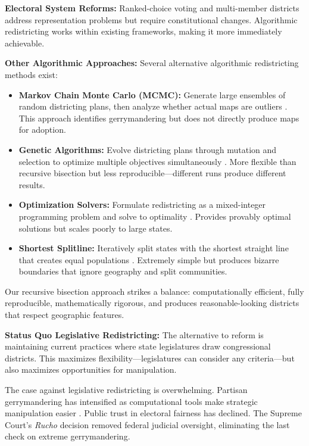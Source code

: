 \textbf{Electoral System Reforms:} Ranked-choice voting and multi-member districts address representation problems but require constitutional changes. Algorithmic redistricting works within existing frameworks, making it more immediately achievable.

\textbf{Other Algorithmic Approaches:} Several alternative algorithmic redistricting methods exist:

\begin{itemize}
    \item \textbf{Markov Chain Monte Carlo (MCMC):} Generate large ensembles of random districting plans, then analyze whether actual maps are outliers \cite{fifield2020automated}. This approach identifies gerrymandering but does not directly produce maps for adoption.
    \item \textbf{Genetic Algorithms:} Evolve districting plans through mutation and selection to optimize multiple objectives simultaneously \cite{liu2016pear}. More flexible than recursive bisection but less reproducible—different runs produce different results.
    \item \textbf{Optimization Solvers:} Formulate redistricting as a mixed-integer programming problem and solve to optimality \cite{garfinkel1970optimal}. Provides provably optimal solutions but scales poorly to large states.
    \item \textbf{Shortest Splitline:} Iteratively split states with the shortest straight line that creates equal populations \cite{duchin2018gerrymandering}. Extremely simple but produces bizarre boundaries that ignore geography and split communities.
\end{itemize}

Our recursive bisection approach strikes a balance: computationally efficient, fully reproducible, mathematically rigorous, and produces reasonable-looking districts that respect geographic features.

\textbf{Status Quo Legislative Redistricting:} The alternative to reform is maintaining current practices where state legislatures draw congressional districts. This maximizes flexibility—legislatures can consider any criteria—but also maximizes opportunities for manipulation.

The case against legislative redistricting is overwhelming. Partisan gerrymandering has intensified as computational tools make strategic manipulation easier \cite{daley2021unrigging}. Public trust in electoral fairness has declined. The Supreme Court's \textit{Rucho} decision removed federal judicial oversight, eliminating the last check on extreme gerrymandering.

